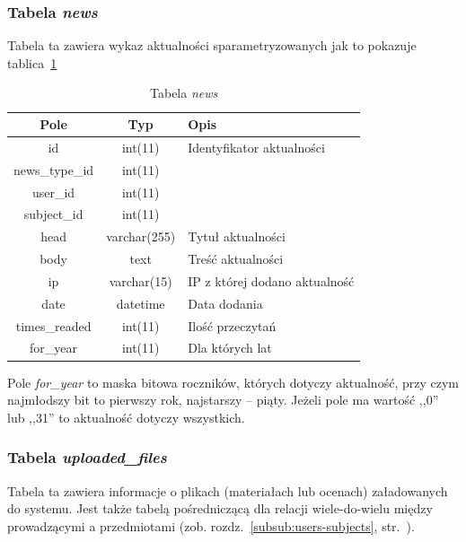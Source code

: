 \documentclass[a4paper,12pt,oneside]{report}
\begin{document}
\newpage
\subsubsection{Tabela \emph{news}}
\label{subsub:news}
Tabela ta zawiera wykaz aktualności sparametryzowanych jak to pokazuje tablica~\ref{tab:news}

\begin{table}[h]
  \centering
  \begin{tabular}{|c|c|l|}\hline
  Pole & Typ & Opis \\\hline
  id             & int(11)      & Identyfikator aktualności \\
  news\_type\_id & int(11)      & \\
  user\_id       & int(11)      & \\
  subject\_id    & int(11)      & \\
  head           & varchar(255) & Tytuł aktualności \\
  body           & text         & Treść aktualności \\
  ip             & varchar(15)  & IP z której dodano aktualność \\
  date           & datetime     & Data dodania \\
  times\_readed  & int(11)      & Ilość przeczytań \\
  for\_year      & int(11)      & Dla których lat \\\hline
  \end{tabular}
  \caption{Tabela \emph{news}\label{tab:news}}
\end{table}

Pole \emph{for\_year} to maska bitowa roczników, których dotyczy aktualność, przy czym najmłodszy bit to pierwszy rok, najstarszy -- piąty. Jeżeli pole ma wartość ,,0'' lub ,,31'' to aktualność dotyczy wszystkich.

\subsubsection{Tabela \emph{uploaded\_files}}
\label{subsub:uploaded_files}
Tabela ta zawiera informacje o plikach (materiałach lub ocenach) załadowanych do systemu. Jest także tabelą pośredniczącą dla relacji wiele-do-wielu między prowadzącymi a przedmiotami (zob. rozdz.~\ref{subsub:users-subjects}, str.~\pageref{subsub:users-subjects}).
\end{document}

